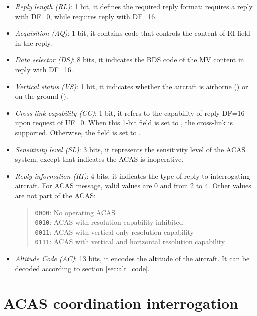 \begin{itemize}
  \item \emph{Reply length (RL)}: 1 bit, it defines the required reply format: \0 requires a reply with DF=0, while \1 requires reply with DF=16.

  \item \emph{Acquisition (AQ)}: 1 bit, it contains code that controls the content of RI field in the reply.

  \item \emph{Data selector (DS)}: 8 bits, it indicates the BDS code of the MV content in reply with DF=16.

  \item \emph{Vertical status (VS)}: 1 bit, it indicates whether the aircraft is airborne (\0) or on the ground (\1).

  \item \emph{Cross-link capability (CC)}: 1 bit, it refers to the capability of reply DF=16 upon request of UF=0. When this 1-bit field is set to \1, the cross-link is supported. Otherwise, the field is set to \0.

  \item \emph{Sensitivity level (SL)}: 3 bits, it represents the sensitivity level of the ACAS system, except that \0 indicates the ACAS is inoperative.

  \item \emph{Reply information (RI)}: 4 bits, it indicates the type of reply to interrogating aircraft. For ACAS message, valid values are 0 and from 2 to 4. Other values are not part of the ACAS:

  \begin{quote}
    \texttt{0000}: No operating ACAS \\
    \texttt{0010}: ACAS with resolution capability inhibited \\
    \texttt{0011}: ACAS with vertical-only resolution capability \\
    \texttt{0111}: ACAS with vertical and horizontal resolution capability
  \end{quote}

  \item \emph{Altitude Code (AC)}: 13 bits, it encodes the altitude of the aircraft. It can be decoded according to section \ref{sec:alt_code}.

\end{itemize}



\section{ACAS coordination interrogation}

